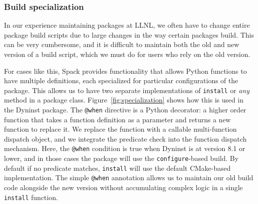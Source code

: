 \subsubsection{Build specialization}

In our experience maintaining packages at LLNL, we often have to change
entire package build scripts due to large changes in the way certain packages build.
This can be very cumbersome, and it is difficult to maintain both the old and new
version of a build script, which we must do for users who rely on the old version.


%

For cases like this, Spack provides functionality that allows Python functions to have
multiple definitions, each specialized for particular configurations of the package.
This allows us to have two separate implementations of {\tt install} or {\it any} method
in a package class. Figure~\ref{fig:specialization} shows how this is used in the Dyninst
package.  The {\tt @when} directive is a Python decorator: a higher order function that
takes a function definition as a parameter and returns a new function to replace it.
We replace the function with a callable multi-function dispatch object, and we
integrate the predicate check into the function dispatch mechanism.  Here, the
{\tt @when} condition is true when Dyninst is at version 8.1 or lower, and in those cases
the package will use the {\tt configure}-based build.  By default if no predicate matches,
{\tt install} will use the default CMake-based implementation. The simple {\tt @when}
annotation allows us to maintain our old build code alongside the new version without
accumulating complex logic in a single {\tt install} function.
